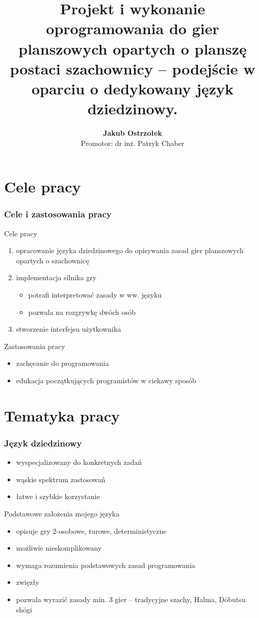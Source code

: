 \documentclass{beamer}
\title[Silnik gier opartych o szachownicę \insertframenumber/\inserttotalframenumber]{
   Projekt i wykonanie oprogramowania do gier planszowych opartych
   o planszę postaci szachownicy -- podejście w oparciu o dedykowany
   język dziedzinowy.}
\author[Jakub Ostrzołek]{\textbf{Jakub Ostrzołek} \\%
\footnotesize Promotor: dr inż. Patryk Chaber}
\institute{Instytut Automatyki i Informatyki Stosowanej\\%
Politechnika Warszawska}
\begin{document}
\frame{\titlepage}


\section{Cele pracy}

\begin{frame}
	\frametitle{Cele i zastosowania pracy}
	Cele pracy
	\begin{enumerate}
		\item opracowanie języka dziedzinowego do opisywania zasad gier planszowych opartych o szachownicę
		\item implementacja silnika gry
		      \begin{itemize}
			      \item potrafi interpretować zasady w ww. języku
			      \item pozwala na rozgrywkę dwóch osób
		      \end{itemize}
		\item stworzenie interfejsu użytkownika
	\end{enumerate}
	Zastosowania pracy
	\begin{itemize}
		\item zachęcanie do programowania
		\item edukacja początkujących programistów w ciekawy sposób
	\end{itemize}
\end{frame}

\section{Tematyka pracy}

\begin{frame}
	\frametitle{Język dziedzinowy}
	\begin{itemize}
		\item wyspecjalizowany do konkretnych zadań
		\item wąskie spektrum zastosowań
		\item łatwe i szybkie korzystanie
	\end{itemize}
	Podstawowe założenia mojego języka
	\begin{itemize}
		\item opisuje gry 2-osobowe, turowe, deterministyczne
		\item możliwie nieskomplikowany
		\item wymaga rozumienia podstawowych zasad programowania
		\item zwięzły
		\item pozwala wyrazić zasady min. 3 gier -- tradycyjne szachy, Halma, Dōbutsu shōgi
	\end{itemize}
\end{frame}
\end{document}
